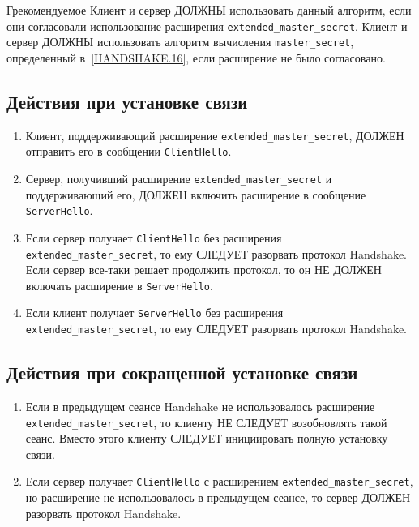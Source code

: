 \begin{appendix}{Г}{рекомендуемое}
Клиент и сервер ДОЛЖНЫ использовать данный алгоритм, если 
они согласовали использование расширения \lstinline{extended_master_secret}. 
%
Клиент и сервер ДОЛЖНЫ использовать алгоритм вычисления
\lstinline{master_secret}, определенный в~\ref{HANDSHAKE.16}, если расширение 
не было согласовано.

\subsection{Действия при установке связи}

\begin{enumerate}
\item
Клиент, поддерживающий  расширение \lstinline{extended_master_secret},
ДОЛЖЕН отправить его в сообщении \lstinline{ClientHello}.

\item
Сервер, получивший расширение \lstinline{extended_master_secret} и
поддерживающий его, ДОЛЖЕН включить расширение в сообщение
\lstinline{ServerHello}.

\item
Если сервер получает \lstinline{ClientHello} без расширения 
\lstinline{extended_master_secret}, то ему СЛЕДУЕТ разорвать протокол 
Handshake. Если сервер все-таки решает продолжить протокол, 
то он НЕ ДОЛЖЕН включать расширение в \lstinline{ServerHello}.

\item
Если клиент получает \lstinline{ServerHello} без расширения 
\lstinline{extended_master_secret},  
то ему СЛЕДУЕТ разорвать протокол Handshake.
\end{enumerate}

\subsection{Действия при сокращенной установке связи}

\begin{enumerate}
\item
Если в предыдущем сеансе Handshake не использовалось расширение
\lstinline{extended_master_secret}, то клиенту НЕ СЛЕДУЕТ возобновлять такой
сеанс. Вместо этого клиенту СЛЕДУЕТ инициировать полную установку связи.

\item
Если сервер получает \lstinline{ClientHello} с расширением
\lstinline{extended_master_secret}, но расширение не использовалось в предыдущем
сеансе, то сервер ДОЛЖЕН разорвать протокол Handshake.


\end{enumerate}
\end{appendix}
